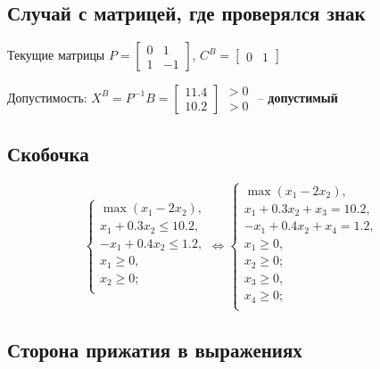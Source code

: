 \subsection{Случай с матрицей, где проверялся знак}

Текущие матрицы $P=\begin{bmatrix}
0 & 1 \\ 1 & -1
\end{bmatrix}$, $C^B=\begin{bmatrix}
0 & 1
\end{bmatrix}$

Допустимость: $X^B=P^{-1}B=\begin{bmatrix}
11.4 \\ 10.2
\end{bmatrix}\begin{matrix}
>0 \\ >0
\end{matrix}$ -- \textbf{допустимый}

\subsection{Скобочка}

\begin{equation*}
\left\{\begin{aligned}
\max\left(x_1-2x_2\right), \\
x_1+0.3x_2\leq 10.2, \\
-x_1+0.4x_2\leq 1.2, \\
x_1\geq 0, \\
x_2\geq 0; \\
\end{aligned}\right. \Longleftrightarrow
\left\{\begin{aligned}
\max\left(x_1-2x_2\right), \\
x_1+0.3x_2+x_3=10.2, \\
-x_1+0.4x_2+x_4=1.2, \\
x_1\geq 0, \\
x_2\geq 0; \\
x_3\geq 0, \\
x_4\geq 0; \\
\end{aligned}\right.
\end{equation*}

\subsection{Сторона прижатия в выражениях}

